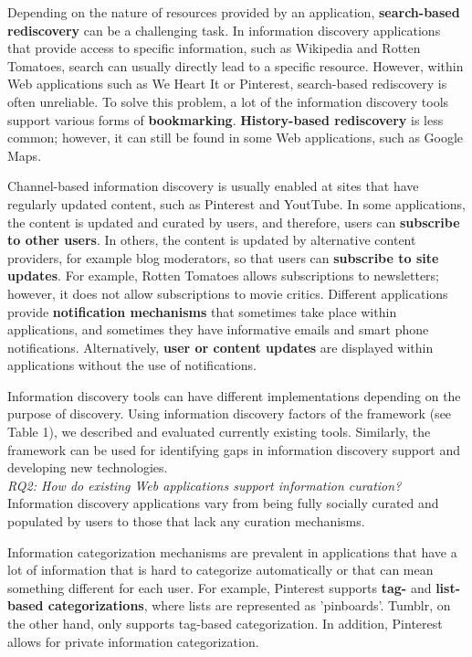 \documentclass{casconpaper}
\begin{document}
{{Depending on the nature of resources provided by an application, \textbf{search-based rediscovery} can be a challenging task. In information discovery applications that provide access to specific information, such as Wikipedia and Rotten Tomatoes, search can usually directly lead to a specific resource. However, within Web applications such as We Heart It or Pinterest, search-based rediscovery is often unreliable. To solve this problem, a lot of the information discovery tools support various forms of \textbf{bookmarking}. \textbf{History-based rediscovery} is less common; however, it  can still be found in some Web applications, such as Google Maps.

Channel-based information discovery is usually enabled at sites that have regularly updated content, such as Pinterest and YoutTube. In some applications, the content is updated and curated by users, and therefore, users can \textbf{subscribe to other users}. In others, the content is updated by alternative content providers, for example blog moderators, so that users can \textbf{subscribe to site updates}. For example, Rotten Tomatoes allows subscriptions to newsletters; however, it does not allow subscriptions to movie critics. Different applications provide \textbf{notification mechanisms} that sometimes take place within applications, and sometimes they have informative emails and smart phone notifications. Alternatively, \textbf{user or content updates} are displayed within applications without the use of notifications.   

Information discovery tools can have different implementations depending on the purpose of discovery. Using information discovery factors of the framework (see Table 1), we described and evaluated currently existing tools. Similarly, the framework can be used for identifying gaps in information discovery support and developing new technologies.   \\

\emph{RQ2: How do existing Web applications support information curation?}\\

Information discovery applications vary from being fully socially curated and populated by users to those that lack any curation mechanisms. 

Information categorization mechanisms are prevalent in applications that have a lot of information that is hard to categorize automatically or that can mean something different for each user. For example, Pinterest supports \textbf{tag-} and \textbf{list-based categorizations}, where lists are represented as 'pinboards'. Tumblr, on the other hand, only supports tag-based categorization. In addition, Pinterest allows for private information categorization.

}}
\end{document}
